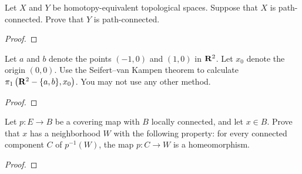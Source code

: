 \begin{problem}
Let $X$ and $Y$ be homotopy-equivalent topological spaces. Suppose that $X$
is path-connected. Prove that $Y$ is path-connected.
\end{problem}
\begin{proof}
\end{proof}

\begin{problem}
Let $a$ and $b$ denote the points $(-1,0)$ and $(1,0)$ in $\mathbf{R}^2$. Let
$x_0$ denote the origin $(0,0)$. Use the Seifert--van Kampen theorem to
calculate $\pi_1\left(\mathbf{R}^2-\{a,b\},x_0\right)$. You may not use any other
method.
\end{problem}
\begin{proof}
\end{proof}

\begin{problem}
Let $p\colon E\to B$ be a covering map with $B$ locally connected, and let
$x\in B$. Prove that $x$ has a neighborhood $W$ with the following
property: for every connected component $C$ of $p^{-1}(W)$, the map
$p\colon C\to W$ is a homeomorphism.
\end{problem}
\begin{proof}
\end{proof}

